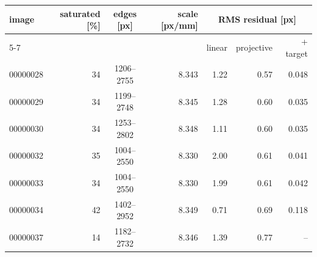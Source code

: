 \begin{tabular}{lrcrrrr}
\toprule
image & saturated [\%] & edges [px] & scale [px/mm] & \multicolumn{3}{c}{RMS residual [px]} \\ \cmidrule(lr){5-7}
& & & & linear & projective & + target \\
\midrule
00000028 & 34 & 1206--2755 & 8.343 & 1.22 & 0.57 & 0.048 \\
00000029 & 34 & 1199--2748 & 8.345 & 1.28 & 0.60 & 0.035 \\
00000030 & 34 & 1253--2802 & 8.348 & 1.11 & 0.60 & 0.035 \\
00000032 & 35 & 1004--2550 & 8.330 & 2.00 & 0.61 & 0.041 \\
00000033 & 34 & 1004--2550 & 8.330 & 1.99 & 0.61 & 0.042 \\
00000034 & 42 & 1402--2952 & 8.349 & 0.71 & 0.69 & 0.118 \\
00000037 & 14 & 1182--2732 & 8.346 & 1.39 & 0.77 & -- \\
\bottomrule
\end{tabular}
